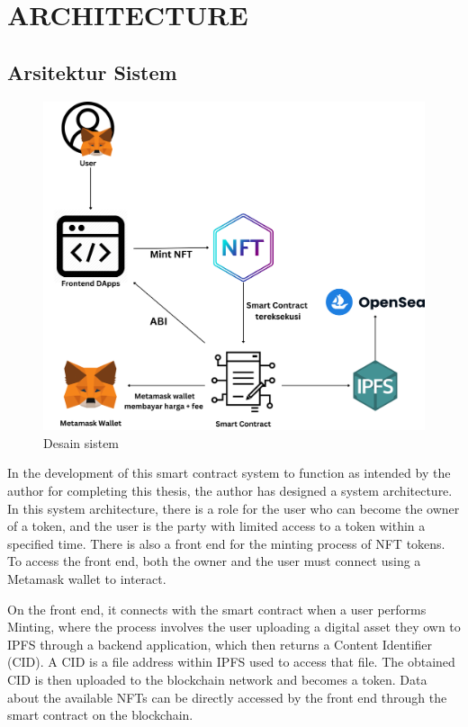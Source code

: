 \section{ARCHITECTURE}
\label{sec:arsitektur}

\subsection{Arsitektur Sistem}
\begin{figure}[H] \centering
  \includegraphics[scale=0.14]{gambar/desain_sistem_new.png}
  \caption{Desain sistem}
  \label{fig:desain_sistem}
\end{figure}

In the development of this smart contract system to function as intended by the author for completing this thesis, the author has designed a system architecture. In this system architecture, there is a role for the user who can become the owner of a token, and the user is the party with limited access to a token within a specified time. There is also a front end for the minting process of NFT tokens. To access the front end, both the owner and the user must connect using a Metamask wallet to interact.

On the front end, it connects with the smart contract when a user performs Minting, where the process involves the user uploading a digital asset they own to IPFS through a backend application, which then returns a Content Identifier (CID). A CID is a file address within IPFS used to access that file. The obtained CID is then uploaded to the blockchain network and becomes a token. Data about the available NFTs can be directly accessed by the front end through the smart contract on the blockchain.

